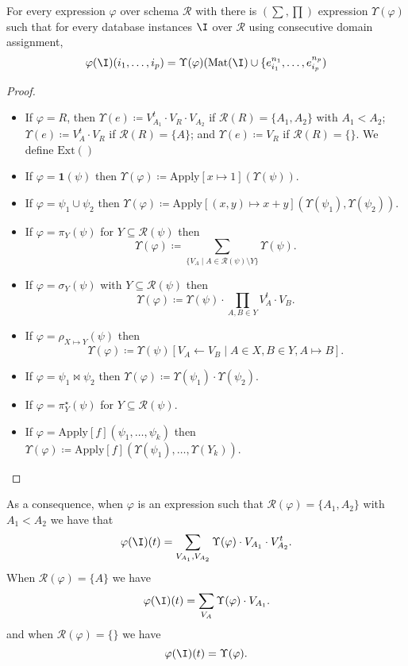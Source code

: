 \begin{lemma}
For every \ARA expression $\varphi$ over schema $\mathcal{R}$ with there is \lang$(\sum,\prod)$ expression $\Upsilon(\varphi)$ such that for every database instances $\I$ over $\mathcal{R}$ using consecutive domain assignment, 
$$
\varphi(\I)(i_1,\ldots,i_p)=\Upsilon(\varphi)(\text{Mat}(\I)\cup \{e_{i_1}^{n_1},\ldots,e_{i_p}^{n_p})
$$
\end{lemma}
\begin{proof}
\begin{itemize}
\item If $\varphi=R$, then $\Upsilon(e)\coloneqq V_{A_1}^t\cdot V_R\cdot V_{A_2}$ if $\mathcal{R}(R)=\{A_1,A_2\}$ with $A_1<A_2$; 
$\Upsilon(e)\coloneqq V_A^t\cdot V_R$ if $\mathcal{R}(R)=\{A\}$; and 
$\Upsilon(e)\coloneqq V_R$ if $\mathcal{R}(R)=\{\}$. We define $\text{Ext}()$
\item If $\varphi=\mathbf{1}(\psi)$  then $
\Upsilon(\varphi)\coloneqq \text{Apply}[x\mapsto 1](\Upsilon(\psi))$.
\item If $\varphi=\psi_1\cup \psi_2$ then
$\Upsilon(\varphi)\coloneqq \text{Apply}[(x,y)\mapsto x+y](\Upsilon(\psi_1),\Upsilon(\psi_2))$.
\item If $\varphi=\pi_{Y}(\psi)$ for $Y\subseteq \mathcal{R}(\psi)$ then
$$
\Upsilon(\varphi)\coloneqq \sum_{\{V_A\mid A\in \mathcal{R}(\psi)\setminus Y\}}\Upsilon(\psi).
 $$
\item If $\varphi=\sigma_{Y}(\psi)$ with $Y\subseteq\mathcal{R}(\psi)$ then
$$
 \Upsilon(\varphi)\coloneqq \Upsilon(\psi)\cdot\prod_{A,B\in Y} V_{A}^t\cdot V_{B}.
$$
\item If $\varphi=\rho_{X\mapsto Y}(\psi)$ then
$$\Upsilon(\varphi)\coloneqq \Upsilon(\psi)[V_A\gets V_B\mid A\in X, B\in Y, A\mapsto B].$$
\item If $\varphi=\psi_1\bowtie \psi_2$ then
$\Upsilon(\varphi)\coloneqq \Upsilon(\psi_1)\cdot \Upsilon(\psi_2)$.
\item If $\varphi=\pi_{Y}^\star(\psi)$ for $Y\subseteq \mathcal{R}(\psi)$.  
\item If $\varphi=\text{Apply}[f](\psi_1,\ldots,\psi_k)$  then
$\Upsilon(\varphi)\coloneqq \text{Apply}[f](\Upsilon(\psi_1),\ldots,\Upsilon(Y_k))$.
\end{itemize}
\end{proof}
As a consequence, when $\varphi$ is an \ARA expression such that $\mathcal{R}(\varphi)=\{A_1,A_2\}$ with $A_1<A_2$ we have that 
$$
\varphi(\I)(t)=
\sum_{V_{A_1},V_{A_2}}\Upsilon(\varphi)\cdot V_{A_1}\cdot V_{A_2}^t.
$$
When $\mathcal{R}(\varphi)=\{A\}$ we have
$$
\varphi(\I)(t)=
\sum_{V_{A}}\Upsilon(\varphi)\cdot V_{A_1}.
$$
and
when $\mathcal{R}(\varphi)=\{\}$ we have
$$
\varphi(\I)(t)=\Upsilon(\varphi).
$$
 


